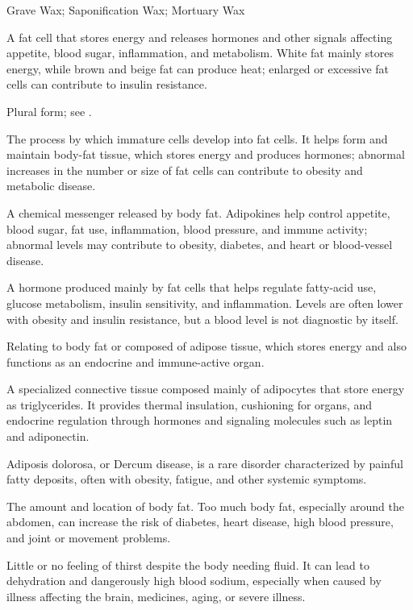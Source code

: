 \synonyms
Grave Wax; Saponification Wax; Mortuary Wax

 A fat cell that stores energy and releases hormones and other signals affecting appetite, blood sugar, inflammation, and metabolism. White fat mainly stores energy, while brown and beige fat can produce heat; enlarged or excessive fat cells can contribute to insulin resistance.

 Plural form; see .

 The process by which immature cells develop into fat cells. It helps form and maintain body-fat tissue, which stores energy and produces hormones; abnormal increases in the number or size of fat cells can contribute to obesity and metabolic disease.

 A chemical messenger released by body fat. Adipokines help control appetite, blood sugar, fat use, inflammation, blood pressure, and immune activity; abnormal levels may contribute to obesity, diabetes, and heart or blood-vessel disease.

 A hormone produced mainly by fat cells that helps regulate fatty-acid use, glucose metabolism, insulin sensitivity, and inflammation. Levels are often lower with obesity and insulin resistance, but a blood level is not diagnostic by itself.

 Relating to body fat or composed of adipose tissue, which stores energy and also functions as an endocrine and immune-active organ.

 A specialized connective tissue composed mainly of adipocytes that store energy as
triglycerides. It provides thermal insulation, cushioning for organs, and endocrine
regulation through hormones and signaling molecules such as leptin and adiponectin.

 Adiposis dolorosa, or Dercum disease, is a rare disorder characterized by painful fatty deposits, often with obesity, fatigue, and other systemic symptoms.

 The amount and location of body fat. Too much body fat, especially around the abdomen, can increase the risk of diabetes, heart disease, high blood pressure, and joint or movement problems.

 Little or no feeling of thirst despite the body needing fluid. It can lead to dehydration and dangerously high blood sodium, especially when caused by illness affecting the brain, medicines, aging, or severe illness.

